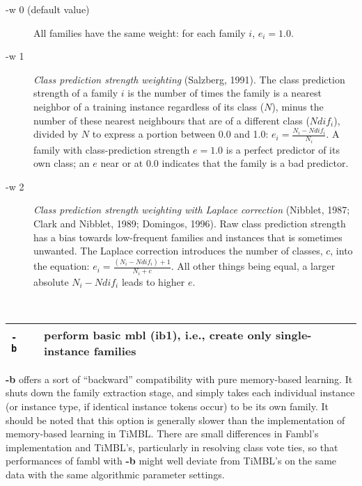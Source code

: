 \documentclass[11pt]{article}
\begin{document}
\begin{description}

\item[-w 0 (default value)] All families have the same weight: for
each family $i$, $e_{i}=1.0$.

\item[-w 1] {\em Class prediction strength weighting} (Salzberg,
1991). The class prediction strength of a family $i$ is the number of
times the family is a nearest neighbor of a training instance
regardless of its class ($N$), minus the number of these nearest
neighbours that are of a different class ($Ndif_{i}$), divided by $N$
to express a portion between 0.0 and 1.0: $e_{i} =
\frac{N_{i}-Ndif_{i}}{N_{i}}$. A family with class-prediction
strength $e=1.0$ is a perfect predictor of its own class; an $e$ near
or at $0.0$ indicates that the family is a bad predictor.

\item[-w 2] {\em Class prediction strength weighting with Laplace
correction} (Nibblet, 1987; Clark and Nibblet, 1989; Domingos,
1996). Raw class prediction strength has a bias towards low-frequent
families and instances that is sometimes unwanted. The Laplace
correction introduces the number of classes, $c$, into the equation:
$e_{i} = \frac{(N_{i}-Ndif_{i})+1}{N_{i}+c}$. All other things being
equal, a larger absolute $N_{i}-Ndif_{i}$ leads to higher $e$.
\end{description}
\ \\

\begin{tabular}{|p{}|p{}|p{}|}
\hline
{\tt -b} & & perform basic {\sc mbl} ({\sc ib1}), i.e., create only 
single-instance families \\
\hline
\end{tabular}

{\bf -b} offers a sort of ``backward'' compatibility with pure
memory-based learning. It shuts down the family extraction stage, and
simply takes each individual instance (or instance type, if identical
instance tokens occur) to be its own family. It should be noted that
this option is generally slower than the implementation of
memory-based learning in TiMBL. There are small differences in Fambl's
implementation and TiMBL's, particularly in resolving class vote ties,
so that performances of {\sc fambl} with {\bf -b} might well deviate
from TiMBL's on the same data with the same algorithmic parameter
settings. \ \\
\end{document}
